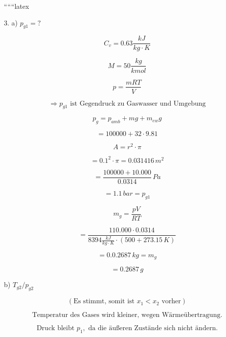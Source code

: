 
``````latex


3. a) $p_{g1} = ?$

\[
C_v = 0.63 \frac{kJ}{kg \cdot K}
\]

\[
M = 50 \frac{kg}{kmol}
\]

\[
p = \frac{mRT}{V}
\]

\[
\Rightarrow p_{g1} \text{ ist Gegendruck zu Gaswasser und Umgebung}
\]

\[
p_g = p_{amb} + mg + m_{ew} g
\]

\[
= 100000 + 32 \cdot 9.81
\]

\[
A = r^2 \cdot \pi
\]

\[
= 0.1^2 \cdot \pi = 0.031416 \, m^2
\]

\[
= \frac{100000 + 10.000}{0.0314} \, Pa
\]

\[
= 1.1 \, bar = p_{g1}
\]

\[
m_g = \frac{pV}{RT}
\]

\[
= \frac{110.000 \cdot 0.0314}{8394 \frac{kJ}{kg \cdot K} \cdot (500 + 273.15 \, K)}
\]

\[
= 0.0.2687 \, kg = m_g
\]

\[
= 0.2687 \, g
\]

b) $T_{g2} / p_{g2}$

\[
\left( \text{Es stimmt, somit ist } x_1 < x_2 \text{ vorher} \right)
\]

\[
\text{Temperatur des Gases wird kleiner, wegen Wärmeübertragung.}
\]

\[
\text{Druck bleibt } p_1, \text{ da die äußeren Zustände sich nicht ändern.}
\]

